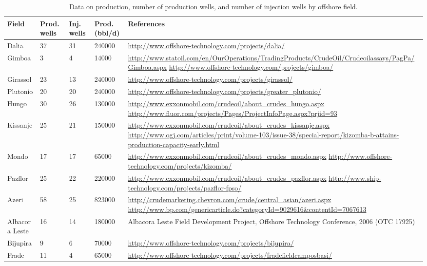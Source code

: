 \documentclass[11pt]{report}
\begin{document}
\begin{landscape}
\begin{table}
\begin{scriptsize}
\caption{Data on production, number of production wells, and number of injection wells by offshore field.}
\label{tab:offshore_inj_prod}
\begin{tabular*}{1\columnwidth}{p{}p{}p{}p{}p{}}
\toprule
Field & Prod. wells &Inj. wells & Prod. (bbl/d) &References \\
\midrule
Dalia &37 &31 &240000 &\url{http://www.offshore-technology.com/projects/dalia/} \\
Gimboa &3 &4 &14000 &\url{http://www.statoil.com/en/OurOperations/TradingProducts/CrudeOil/Crudeoilassays/PagPa/Gimboa.aspx}
\url{http://www.offshore-technology.com/projects/gimboa/} \\
Girassol &23 &13 &240000 &\url{http://www.offshore-technology.com/projects/girassol/} \\
Plutonio &20 &20 &240000 &\url{http://www.offshore-technology.com/projects/greater_plutonio/} \\
Hungo &30 &26 &130000 &\url{http://www.exxonmobil.com/crudeoil/about_crudes_hungo.aspx}
\url{http://www.fluor.com/projects/Pages/ProjectInfoPage.aspx?prjid=93} \\
Kissanje &25 &21 &150000 &\url{http://www.exxonmobil.com/crudeoil/about_crudes_kissanje.aspx} 
\url{http://www.ogj.com/articles/print/volume-103/issue-38/special-report/kizomba-b-attains-production-capacity-early.html} \\
Mondo &17 &17 &65000 &\url{http://www.exxonmobil.com/crudeoil/about_crudes_mondo.aspx}
\url{http://www.offshore-technology.com/projects/kizomba/} \\
Pazflor &25 &22 &220000 &\url{http://www.exxonmobil.com/crudeoil/about_crudes_pazflor.aspx}
\url{http://www.ship-technology.com/projects/pazflor-fpso/} \\
Azeri &58 &25 &823000 &\url{http://crudemarketing.chevron.com/crude/central_asian/azeri.aspx}
\url{http://www.bp.com/genericarticle.do?categoryId=9029616&contentId=7067613} \\
Albacora Leste &16 &14 &180000 &Albacora Leste Field Development Project, Offshore Technology Conference, 2006 (OTC 17925) \\
Bijupira &9 &6 &70000 &\url{http://www.offshore-technology.com/projects/bijupira/} \\
Frade &11 &4 &65000 &\url{http://www.offshore-technology.com/projects/fradefieldcamposbasi/} \\

\end{tabular*}
\end{scriptsize}
\end{table}
\end{landscape}
\end{document}
